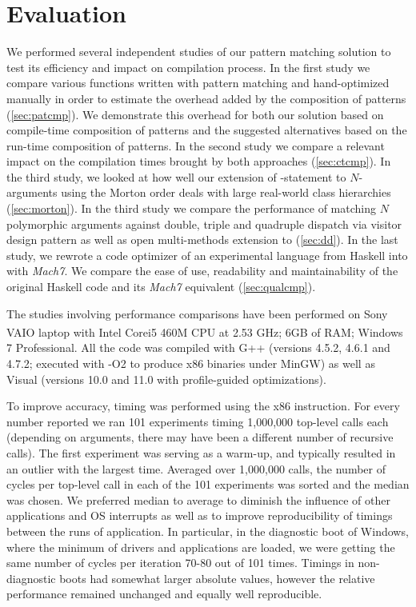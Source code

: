 \section{Evaluation} %
\label{sec:eval}

We performed several independent studies of our pattern matching solution to 
test its efficiency and impact on compilation process. In the first study we 
compare various functions written with pattern matching and hand-optimized 
manually in order to estimate the overhead added by the composition of patterns 
(\textsection\ref{sec:patcmp}). We demonstrate this overhead for both our 
solution based on compile-time composition of patterns and the suggested 
alternatives based on the run-time composition of patterns. In the second 
study we compare a relevant impact on the compilation times brought by both 
approaches (\textsection\ref{sec:ctcmp}). In the third study, we looked at how well our extension 
of -statement to $N$-arguments using the Morton order deals with 
large real-world class hierarchies (\textsection\ref{sec:morton}). In the third 
study we compare the performance of matching $N$ polymorphic arguments against 
double, triple and quadruple dispatch via visitor design pattern as well as 
open multi-methods extension to \Cpp{} (\textsection\ref{sec:dd}). 
In the last study, we rewrote a code 
optimizer of an experimental language from Haskell into \Cpp{} with 
\emph{Mach7}. We compare the ease of use, readability and maintainability 
of the original Haskell code and its \emph{Mach7} equivalent 
(\textsection\ref{sec:qualcmp}).

The studies involving performance comparisons have been performed on 
Sony VAIO\textsuperscript{\textregistered} laptop with 
Intel\textsuperscript{\textregistered} Core\texttrademark i5 460M CPU at 2.53 
GHz; 6GB of RAM; Windows 7 Professional. All the code was compiled with G++ 
(versions 4.5.2, 4.6.1 and 4.7.2; executed with -O2 to produce x86 binaries 
under MinGW) as well as Visual \Cpp{} (versions 10.0 and 11.0 with 
profile-guided optimizations).
 
To improve accuracy, timing was performed using the x86  
instruction. For every number reported we ran 
101 experiments timing 1,000,000 top-level calls each (depending on arguments, 
there may have been a different number of recursive calls). The first experiment 
was serving as a warm-up, and typically resulted in an outlier with the largest 
time. Averaged over 1,000,000 calls, the number of cycles per top-level call in 
each of the 101 experiments was sorted and the median was chosen. We preferred 
median to average to diminish the influence of other applications and OS 
interrupts as well as to improve reproducibility of timings between the runs of 
application. In particular, in the diagnostic boot of Windows, where the minimum 
of drivers and applications are loaded, we were getting the same number of 
cycles per iteration 70-80 out of 101 times. Timings in non-diagnostic boots had 
somewhat larger absolute values, however the relative performance remained 
unchanged and equally well reproducible.

